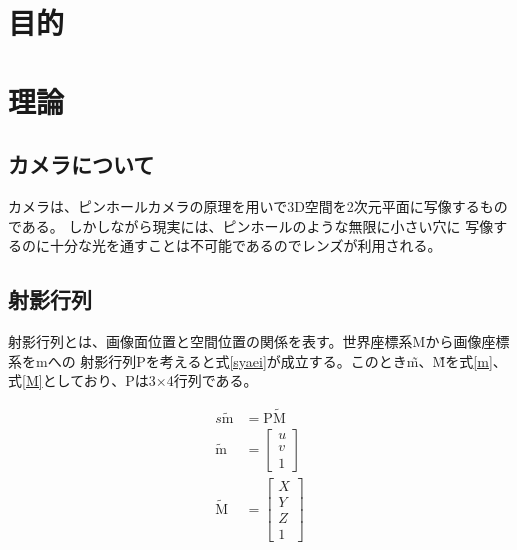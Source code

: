 \documentclass[11pt,a4j]{jsarticle}
\begin{document}


\section{目的}


\section{理論}
\label{sec:理論}


\subsection{カメラについて}
\label{sub:カメラについて}

カメラは、ピンホールカメラの原理を用いで3D空間を2次元平面に写像するものである。
しかしながら現実には、ピンホールのような無限に小さい穴に
写像するのに十分な光を通すことは不可能であるのでレンズが利用される。


\subsection{射影行列}
\label{sub:射影行列}
射影行列とは、画像面位置と空間位置の関係を表す。世界座標系Mから画像座標系をmへの
射影行列Pを考えると式\ref{syaei}が成立する。このとき\~m、\~Mを式\ref{m}、式\ref{M}としており、Pは3×4行列である。

\begin{align}
  s\mathrm{\tilde{m}} &= \mathrm{P\tilde{M}} \label{syaei} \\[0.3cm]
  \mathrm{\tilde{m}} &= \left[
    \begin{array}{c}
      u \\ v \\ 1
    \end{array}
  \right] \label{m} \\[0.3cm]
  \mathrm{\tilde{M}} &= \left[
    \begin{array}{c}
      X \\ Y \\ Z \\ 1
    \end{array}
  \right] \label{M}
\end{align}
\end{document}
